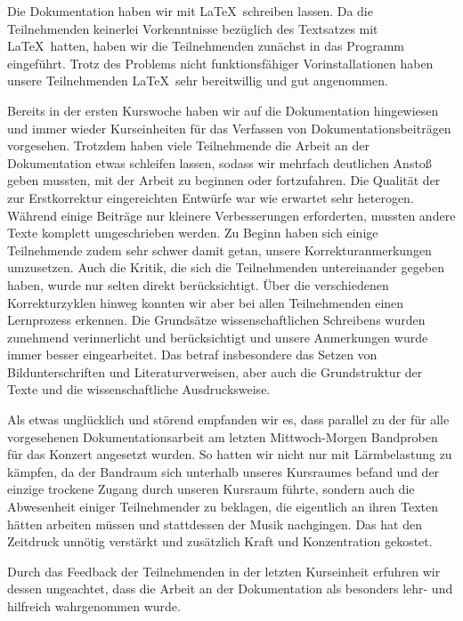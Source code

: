\documentclass{scrartcl}
\begin{document}
Die Dokumentation haben wir mit \LaTeX\ schreiben lassen. Da die Teilnehmenden keinerlei Vorkenntnisse bez{\"u}glich des Textsatzes mit \LaTeX\ hatten, haben wir die Teilnehmenden zun{\"a}chst in das Programm eingef{\"u}hrt. Trotz des Problems nicht funktionsf{\"a}higer Vorinstallationen haben unsere Teilnehmenden \LaTeX\ sehr bereitwillig und gut angenommen.\medskip

Bereits in der ersten Kurswoche haben wir auf die Dokumentation hingewiesen und immer wieder Kurseinheiten f{\"u}r das Verfassen von Dokumentationsbeitr{\"a}gen vorgesehen. Trotzdem haben viele Teilnehmende die Arbeit an der Dokumentation etwas schleifen lassen, sodass wir mehrfach deutlichen Ansto{\ss} geben mussten, mit der Arbeit zu beginnen oder fortzufahren. Die Qualit{\"a}t der zur Erstkorrektur eingereichten Entw{\"u}rfe war wie erwartet sehr heterogen. W{\"a}hrend einige Beitr{\"a}ge nur kleinere Verbesserungen erforderten, mussten andere Texte komplett umgeschrieben werden. Zu Beginn haben sich einige Teilnehmende zudem sehr schwer damit getan, unsere Korrekturanmerkungen umzusetzen. Auch die Kritik, die sich die Teilnehmenden untereinander gegeben haben, wurde nur selten direkt ber{\"u}cksichtigt. {\"U}ber die verschiedenen Korrekturzyklen hinweg konnten wir aber bei allen Teilnehmenden einen Lernprozess erkennen. Die Grunds{\"a}tze wissenschaftlichen Schreibens wurden zunehmend verinnerlicht und ber{\"u}cksichtigt und unsere Anmerkungen wurde immer besser eingearbeitet. Das betraf insbesondere das Setzen von Bildunterschriften und Literaturverweisen, aber auch die Grundstruktur der Texte und die wissenschaftliche Ausdrucksweise.\medskip

Als etwas ungl{\"u}cklich und st{\"o}rend empfanden wir es, dass parallel zu
der f{\"u}r alle vorgesehenen Dokumentationsarbeit am letzten Mittwoch-Morgen
Bandproben f{\"u}r das Konzert angesetzt wurden. So hatten wir nicht nur mit
L{\"a}rmbelastung zu k{\"a}mpfen, da der Bandraum sich unterhalb unseres
Kursraumes befand und der einzige trockene Zugang durch unseren Kursraum
f{\"u}hrte, sondern auch die Abwesenheit einiger
Teilnehmender zu beklagen, die eigentlich an ihren Texten h{\"a}tten arbeiten
m{\"u}ssen und stattdessen der Musik nachgingen. Das hat den Zeitdruck
unn{\"o}tig verst{\"a}rkt und zus{\"a}tzlich Kraft und Konzentration
gekostet.\medskip

Durch das Feedback der Teilnehmenden in der letzten Kurseinheit erfuhren wir dessen ungeachtet, dass die Arbeit an der Dokumentation als besonders lehr- und hilfreich wahrgenommen wurde.
\end{document}
